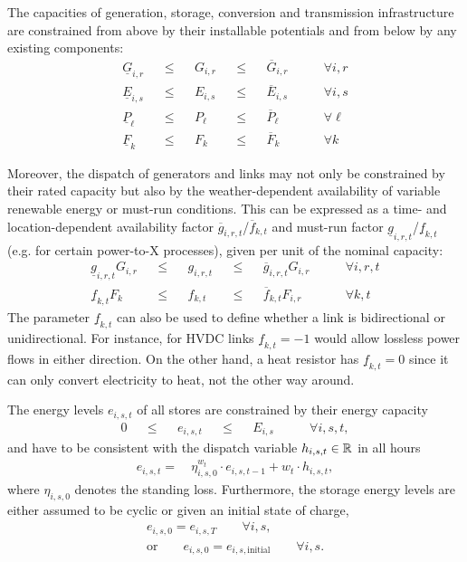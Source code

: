 The capacities of generation, storage, conversion and transmission
infrastructure are constrained from above by their installable potentials and
from below by any existing components:
\begin{align}
  \underline{G}_{i,r}  &  & \leq &  & G_{i,r}  &  & \leq &  & \overline{G}_{i,r}  & \qquad\forall i, r \label{eq:genlimit} \\
  \underline{E}_{i,s}  &  & \leq &  & E_{i,s}  &  & \leq &  & \overline{E}_{i,s}  & \qquad\forall i, s \\
  \underline{P}_{\ell} &  & \leq &  & P_{\ell} &  & \leq &  & \overline{P}_{\ell} & \qquad\forall \ell \\
  \underline{F}_{k} &  & \leq &  & F_{k} &  & \leq &  & \overline{F}_{k} & \qquad\forall k
\end{align}

Moreover, the dispatch of generators and links may not only be constrained by
their rated capacity but also by the weather-dependent availability of variable
renewable energy or must-run conditions. This can be expressed as a time- and
location-dependent availability factor
$\overline{g}_{i,r,t}$/$\overline{f}_{k,t}$  and must-run factor
$\underline{g}_{i,r,t}$/$\underline{f}_{k,t}$ (e.g. for certain power-to-X processes),
given per unit of the nominal capacity:
\begin{align}
    \underline{g}_{i,r,t}  G_{i,r} &  & \leq &  & g_{i,r,t} &  & \leq &  & \overline{g}_{i,r,t} G_{i,r} & \qquad\forall i, r, t \\
    \underline{f}_{k,t}  F_{k} &  & \leq &  & f_{k,t} &  & \leq &  & \overline{f}_{k,t} F_{i,r} & \qquad\forall k, t
\end{align}
The parameter $\underline{f}_{k,t}$ can also be used to define whether a link is
bidirectional or unidirectional. For instance, for HVDC links
$\underline{f}_{k,t}=-1$ would allow lossless power flows in either direction.
On the other hand, a heat resistor has $\underline{f}_{k,t}=0$ since it can only
convert electricity to heat, not the other way around.

The energy levels $e_{i,s,t}$ of all stores are constrained by their energy capacity
\begin{align}
  0 &  & \leq &  & e_{i,s,t} &  & \leq &  & E_{i,s} & \qquad\forall i, s, t,
\end{align}
and have to be consistent with the dispatch variable $h_{i,s,t}\in\mathbb{R}$ in all
hours
\begin{align}
  e_{i,s,t} =\: & \eta_{i,s,0}^{w_t} \cdot e_{i,s,t-1} + w_t \cdot h_{i,s,t}, \label{eq:stoe}
\end{align}
where $\eta_{i,s,0}$ denotes the standing loss. Furthermore, the storage energy
levels are either assumed to be cyclic or given an initial state of charge,
\begin{align}
  e_{i,s,0} = e_{i,s,T} \qquad\forall i, s,\\
  \text{or} \qquad e_{i,s,0} = e_{i,s,\text{initial}} \qquad\forall i, s.
\end{align}

